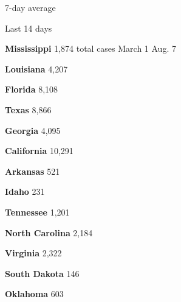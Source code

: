 \href{https://www.nytimes.com/interactive/2020/us/mississippi-coronavirus-cases.html}{}

7-day average

Last 14 days

\textbf{Mississippi} 1,874 total cases March 1 Aug. 7

\href{https://www.nytimes.com/interactive/2020/us/louisiana-coronavirus-cases.html}{}

\textbf{Louisiana} 4,207

\href{https://www.nytimes.com/interactive/2020/us/florida-coronavirus-cases.html}{}

\textbf{Florida} 8,108

\href{https://www.nytimes.com/interactive/2020/us/texas-coronavirus-cases.html}{}

\textbf{Texas} 8,866

\href{https://www.nytimes.com/interactive/2020/us/georgia-coronavirus-cases.html}{}

\textbf{Georgia} 4,095

\href{https://www.nytimes.com/interactive/2020/us/california-coronavirus-cases.html}{}

\textbf{California} 10,291

\href{https://www.nytimes.com/interactive/2020/us/arkansas-coronavirus-cases.html}{}

\textbf{Arkansas} 521

\href{https://www.nytimes.com/interactive/2020/us/idaho-coronavirus-cases.html}{}

\textbf{Idaho} 231

\href{https://www.nytimes.com/interactive/2020/us/tennessee-coronavirus-cases.html}{}

\textbf{Tennessee} 1,201

\href{https://www.nytimes.com/interactive/2020/us/north-carolina-coronavirus-cases.html}{}

\textbf{North Carolina} 2,184

\href{https://www.nytimes.com/interactive/2020/us/virginia-coronavirus-cases.html}{}

\textbf{Virginia} 2,322

\href{https://www.nytimes.com/interactive/2020/us/south-dakota-coronavirus-cases.html}{}

\textbf{South Dakota} 146

\href{https://www.nytimes.com/interactive/2020/us/oklahoma-coronavirus-cases.html}{}

\textbf{Oklahoma} 603

